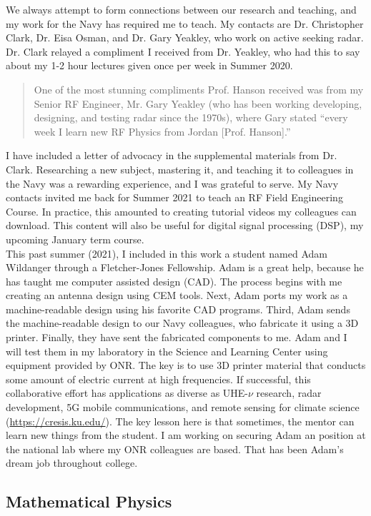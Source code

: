 \documentclass[../../../main.tex]{subfiles}
\begin{document}
We always attempt to form connections between our research and teaching, and my work for the Navy has required me to teach.  My contacts are Dr. Christopher Clark, Dr. Eisa Osman, and Dr. Gary Yeakley, who work on active seeking radar.  Dr. Clark relayed a compliment I received from Dr. Yeakley, who had this to say about my 1-2 hour lectures given once per week in Summer 2020.
\begin{quote}
One of the most stunning compliments Prof. Hanson received was from my Senior RF Engineer, Mr. Gary Yeakley (who has been working developing, designing, and testing radar since the 1970s), where Gary stated ``every week I learn new RF Physics from Jordan [Prof. Hanson].''
\end{quote}
I have included a letter of advocacy in the supplemental materials from Dr. Clark.  Researching a new subject, mastering it, and teaching it to colleagues in the Navy was a rewarding experience, and I was grateful to serve.  My Navy contacts invited me back for Summer 2021 to teach an RF Field Engineering Course.  In practice, this amounted to creating tutorial videos my colleagues can download.  This content will also be useful for digital signal processing (DSP), my upcoming January term course.
\\
\vspace{0.25cm}
This past summer (2021), I included in this work a student named Adam Wildanger through a Fletcher-Jones Fellowship.  Adam is a great help, because he has taught me computer assisted design (CAD).  The process begins with me creating an antenna design using CEM tools.  Next, Adam ports my work as a machine-readable design using his favorite CAD programs.  Third, Adam sends the machine-readable design to our Navy colleagues, who fabricate it using a 3D printer.  Finally, they have sent the fabricated components to me.  Adam and I will test them in my laboratory in the Science and Learning Center using equipment provided by ONR.  The key is to use 3D printer material that conducts some amount of electric current at high frequencies.  If successful, this collaborative effort has applications as diverse as UHE-$\nu$ research, radar development, 5G mobile communications, and remote sensing for climate science (\url{https://cresis.ku.edu/}).  The key lesson here is that sometimes, the mentor can learn new things from the student.  I am working on securing Adam an position at the national lab where my ONR colleagues are based.  That has been Adam's dream job throughout college.

\subsection{Mathematical Physics}
\end{document}
